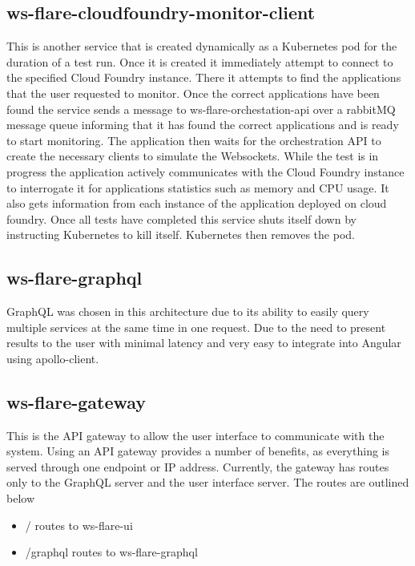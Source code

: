 \subsection{ws-flare-cloudfoundry-monitor-client}

This is another service that is created dynamically as a Kubernetes pod for the duration of a test run. Once it is created it immediately attempt to connect to the specified Cloud Foundry instance. There it attempts to find the applications that the user requested to monitor. Once the correct applications have been found the service sends a message to ws-flare-orchestation-api over a rabbitMQ message queue informing that it has found the correct applications and is ready to start monitoring. The application then waits for the orchestration API to create the necessary clients to simulate the Websockets. While the test is in progress the application actively communicates with the Cloud Foundry instance to interrogate it for applications statistics such as memory and CPU usage. It also gets information from each instance of the application deployed on cloud foundry. Once all tests have completed this service shuts itself down by instructing Kubernetes to kill itself. Kubernetes then removes the pod.

\subsection{ws-flare-graphql}

GraphQL was chosen in this architecture due to its ability to easily query multiple services at the same time in one request. Due to the need to present results to the user with minimal latency and very easy to integrate into Angular using apollo-client.

\subsection{ws-flare-gateway}

This is the API gateway to allow the user interface to communicate with the system. Using an API gateway provides a number of benefits, as everything is served through one endpoint or IP address. Currently, the gateway has routes only to the GraphQL server and the user interface server. The routes are outlined below

\begin{itemize}
  \item / routes to ws-flare-ui
  \item /graphql routes to ws-flare-graphql
\end{itemize}

